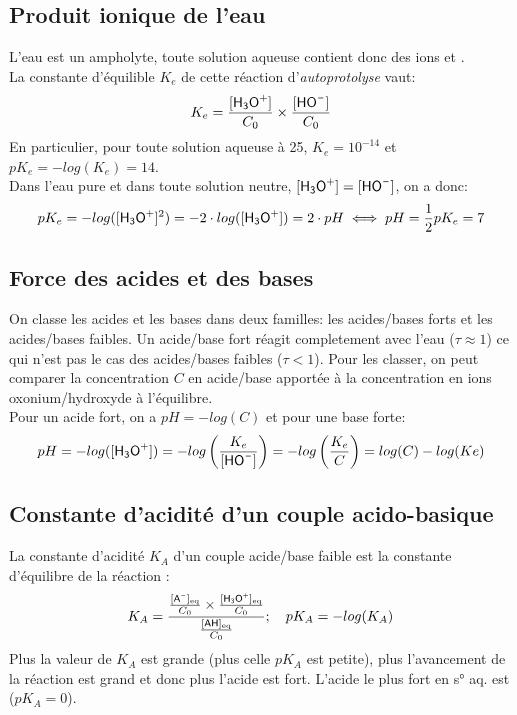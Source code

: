 \documentclass[a5paper,10pt]{article}
\begin{document}
\subsection{Produit ionique de l'eau}
L'eau est un ampholyte, toute solution aqueuse contient donc des ions  et .\\
La constante d'équilible $K_e$ de cette réaction d'\textit{autoprotolyse} vaut:
$$K_e=\frac{[\text{\ce{H3O+}}]}{C_0}\times \frac{[\text{\ce{HO-}}]}{C_0}$$
En particulier, pour toute solution aqueuse à 25\textcelsius, $K_e=10^{-14}$ et $pK_e=-log(K_e)=14$.\\
Dans l'eau pure et dans toute solution neutre, $[\text{\ce{H3O+}}]=[\text{\ce{HO-}}]$, on a donc:
$$pK_e=-log([\text{\ce{H3O+}}]^2)=-2\cdot log([\text{\ce{H3O+}}])=2\cdot pH \iff pH=\frac{1}{2}pK_e=7$$

\subsection{Force des acides et des bases}
On classe les acides et les bases dans deux familles: les acides/bases forts et les acides/bases faibles.
Un acide/base fort réagit completement avec l'eau ($\tau\approx 1$) ce qui n'est pas le cas des acides/bases faibles ($\tau < 1$).
Pour les classer, on peut comparer la concentration $C$ en acide/base apportée à la concentration en ions oxonium/hydroxyde à l'équilibre.\\
Pour un acide fort, on a $pH=-log(C)$ et pour une base forte:
$$pH=-log([\text{\ce{H3O+}}])=-log\left(\frac{K_e}{[\text{\ce{HO-}}]}\right)=-log\left(\frac{K_e}{C}\right)=log(C)-log(Ke)$$

\subsection{Constante d'acidité d'un couple acido-basique}
La constante d'acidité $K_A$ d'un couple acide/base faible est la constante d'équilibre de la réaction :
$$K_A=\frac{\frac{[\text{\ce{A-}}]_{\text{eq}}}{C_0} \times \frac{[\text{\ce{H3O+}}]_{\text{eq}}}{C_0}}{\frac{[\text{\ce{AH}}]_{\text{eq}}}{C_0}};\quad pK_A=-log(K_A)$$
Plus la valeur de $K_A$ est grande (plus celle $pK_A$ est petite), plus l'avancement de la réaction est grand et donc plus l'acide est fort.
L'acide le plus fort en s° aq. est  ($pK_A=0$).
\end{document}
